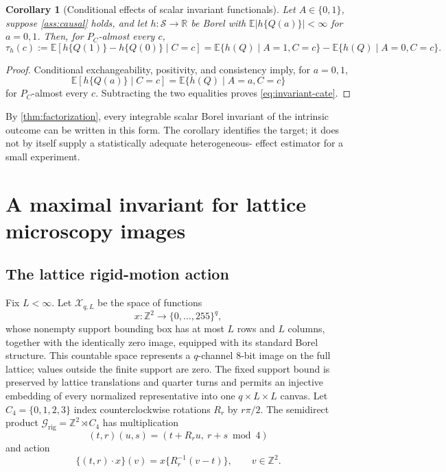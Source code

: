 \documentclass[11pt]{article}
\newtheorem{corollary}[theorem]{Corollary}
\theoremstyle{definition}
\theoremstyle{remark}
\newcommand{\cX}{\mathcal X}
\newcommand{\cS}{\mathcal S}
\newcommand{\cG}{\mathcal G}
\newcommand{\bE}{\mathbb E}
\newcommand{\bR}{\mathbb R}
\newcommand{\bZ}{\mathbb Z}
\newcommand{\1}{\mathbf 1}
\begin{document}
\begin{corollary}[Conditional effects of scalar invariant functionals]
\label{cor:invariant-cate}
Let \(A\in\{0,1\}\), suppose \cref{ass:causal} holds, and let
\(h:\cS\to\bR\) be Borel with
\(\bE|h\{Q(a)\}|<\infty\) for \(a=0,1\).  Then, for \(P_C\)-almost every
\(c\),
\begin{equation}\label{eq:invariant-cate}
 \tau_h(c)
 :=
 \bE\!\left[h\{Q(1)\}-h\{Q(0)\}\mid C=c\right]
 =
 \bE\{h(Q)\mid A=1,C=c\}
 -
 \bE\{h(Q)\mid A=0,C=c\}.
\end{equation}
\end{corollary}

\begin{proof}
Conditional exchangeability, positivity, and consistency imply, for
\(a=0,1\),
\[
  \bE[h\{Q(a)\}\mid C=c]
  =\bE\{h(Q)\mid A=a,C=c\}
\]
for \(P_C\)-almost every \(c\).  Subtracting the two equalities proves
\eqref{eq:invariant-cate}.
\end{proof}

By \cref{thm:factorization}, every integrable scalar Borel invariant of the
intrinsic outcome can be written in this form.  The corollary identifies the
target; it does not by itself supply a statistically adequate heterogeneous-
effect estimator for a small experiment.

\section{A maximal invariant for lattice microscopy images}
\label{sec:lattice}

\subsection{The lattice rigid-motion action}

Fix \(L<\infty\).  Let \(\cX_{q,L}\) be the space of functions
\[
 x:\bZ^2\longrightarrow\{0,\ldots,255\}^{q},
\]
whose nonempty support bounding box has at most \(L\) rows and \(L\) columns,
together with the identically zero image, equipped with its standard Borel
structure.  This countable space represents a
\(q\)-channel 8-bit image on the full lattice; values outside the finite
support are zero.  The fixed support bound is preserved by lattice translations
and quarter turns and permits an injective embedding of every normalized
representative into one \(q\times L\times L\) canvas.
Let \(C_4=\{0,1,2,3\}\) index counterclockwise rotations
\(R_r\) by \(r\pi/2\).  The semidirect product
\(\cG_{\mathrm{rig}}=\bZ^2\rtimes C_4\) has multiplication
\[
 (t,r)(u,s)=(t+R_r u,\ r+s\bmod 4)
\]
and action
\begin{equation}\label{eq:lattice-action}
 \{(t,r)\cdot x\}(v)=x\{R_r^{-1}(v-t)\},\qquad v\in\bZ^2.
\end{equation}
\end{document}
